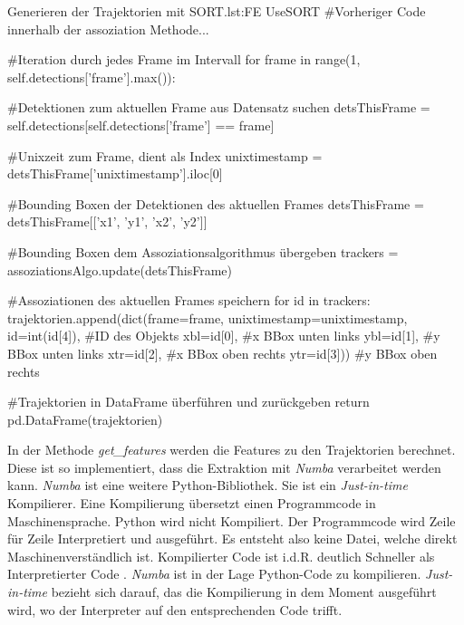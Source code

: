 \begin{pythoncode}{Generieren der Trajektorien mit SORT.}{lst:FE UseSORT}
#Vorheriger Code innerhalb der assoziation Methode...

#Iteration durch jedes Frame im Intervall
for frame in range(1, self.detections['frame'].max()):
    
    #Detektionen zum aktuellen Frame aus Datensatz suchen
    detsThisFrame = self.detections[self.detections['frame'] == frame]

    #Unixzeit zum Frame, dient als Index
    unixtimestamp = detsThisFrame['unixtimestamp'].iloc[0]

    #Bounding Boxen der Detektionen des aktuellen Frames
    detsThisFrame = detsThisFrame[['x1', 'y1', 'x2', 'y2']] 

    #Bounding Boxen dem Assoziationsalgorithmus übergeben
    trackers = assoziationsAlgo.update(detsThisFrame) 

    #Assoziationen des aktuellen Frames speichern 
    for id in trackers:
        trajektorien.append(dict(frame=frame,
                          unixtimestamp=unixtimestamp, 
                          id=int(id[4]),    #ID des Objekts
                          xbl=id[0],        #x BBox unten links
                          ybl=id[1],        #y BBox unten links
                          xtr=id[2],        #x BBox oben rechts
                          ytr=id[3]))       #y BBox oben rechts

    #Trajektorien in DataFrame überführen und zurückgeben
    return pd.DataFrame(trajektorien)
\end{pythoncode}

In der Methode \textit{get\_features} werden die Features zu den Trajektorien berechnet. Diese ist so implementiert, dass die Extraktion mit \textit{Numba} verarbeitet werden kann. \textit{Numba} ist eine weitere Python-Bibliothek. Sie ist ein \textit{\gls{Just-in-time}} Kompilierer. Eine Kompilierung übersetzt einen Programmcode in Maschinensprache. Python wird nicht Kompiliert. Der Programmcode wird Zeile für Zeile Interpretiert und ausgeführt. Es entsteht also keine Datei, welche direkt Maschinenverständlich ist. Kompilierter Code ist i.d.R. deutlich Schneller als Interpretierter Code \cite{Scholz.2005}. \textit{Numba} ist in der Lage Python-Code zu kompilieren. \textit{Just-in-time} bezieht sich darauf, das die Kompilierung in dem Moment ausgeführt wird, wo der Interpreter auf den entsprechenden Code trifft. \par

